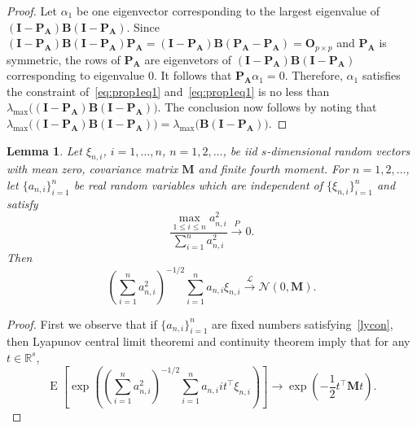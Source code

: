 \documentclass[12pt]{article} %
\DeclareMathOperator{\myE}{E}
\newcommand{\bM}{\mathbf{M}}
\newcommand{\bA}{\mathbf{A}}
\newcommand{\bB}{\mathbf{B}}
\newcommand{\bP}{\mathbf{P}}
\newcommand{\bO}{\mathbf{O}}
\newcommand{\bI}{\mathbf{I}}
\newtheorem{lemma}{Lemma}
\theoremstyle{definition}
\begin{document}
\begin{appendices}
\begin{proof}
    Let $\alpha_1$ be one eigenvector corresponding to the largest eigenvalue of $(\bI-\bP_\bA)\bB(\bI-\bP_\bA)$.
    Since $(\bI-\bP_\bA)\bB(\bI-\bP_\bA)\bP_\bA=(\bI-\bP_\bA)\bB(\bP_\bA-\bP_\bA)=\bO_{p\times p}$ and $\bP_\bA$ is symmetric, the rows of $\bP_\bA$ are eigenvetors of $(\bI-\bP_\bA)\bB(\bI-\bP_\bA)$ corresponding to eigenvalue $0$.
    It follows that $\bP_\bA\alpha_1=0$.
    Therefore, $\alpha_1$ satisfies the constraint of~\eqref{eq:prop1eq1} and~\eqref{eq:prop1eq1} is no less than $\lambda_{\max}\big((\bI-\bP_\bA)\bB(\bI-\bP_\bA)\big)$.
    The conclusion now follows by noting that $\lambda_{\max}\big((\bI-\bP_\bA)\bB(\bI-\bP_\bA)\big)=\lambda_{\max}\big( \bB(\bI-\bP_\bA)\big)$.
    
\end{proof}

\begin{lemma}
    Let $\xi_{n,i}$, $i=1,\ldots, n$, $n=1,2,\ldots$, be iid $s$-dimensional random vectors with mean zero, covariance matrix $\bM$ and finite fourth moment.
    For $n=1,2,\ldots$, let $\{a_{n,i}\}_{i=1}^n$ be real random variables which are independent of $\{\xi_{n,i}\}_{i=1}^n$ and satisfy 
    \begin{equation}\label{lycon}
        \frac{\max_{1\leq i\leq n}a_{n,i}^2}{\sum_{i=1}^n a_{n,i}^2}\xrightarrow{P}0.
    \end{equation}
    Then
    \begin{equation*}
    (\sum_{i=1}^n a_{n,i}^2)^{-1/2}\sum_{i=1}^n a_{n,i}\xi_{n,i} 
    \xrightarrow{\mathcal{L}}\mathcal{N}(0,\bM).
    \end{equation*}
    \label{CLTLEMMA}
\end{lemma}
\begin{proof}
    First we observe that if $\{a_{n,i}\}_{i=1}^n$ are fixed numbers satisfying~\eqref{lycon}, then Lyapunov central limit theoremi and continuity theorem imply that 
    for any $t\in\mathbb{R}^s$,
    \begin{equation*}
        \myE\left[\exp\left(
    (\sum_{i=1}^n a_{n,i}^2)^{-1/2}\sum_{i=1}^n a_{n,i}it^\top \xi_{n,i} 
    \right)\right]
    \to
    \exp\left(-\frac{1}{2} t^\top \bM t\right).
    \end{equation*}


\end{proof}
\end{appendices}
\end{document}
